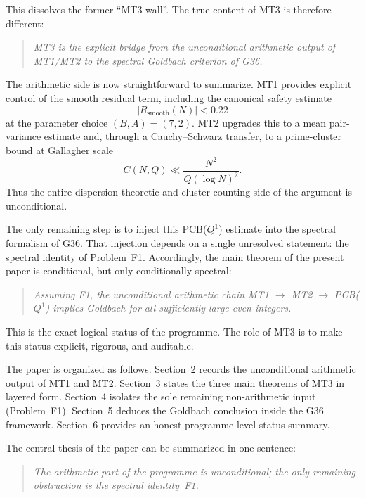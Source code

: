 \documentclass[11pt,a4paper]{article}
\begin{document}
This dissolves the former ``MT3 wall''. The true content of MT3 is therefore different:

\begin{quote}
\emph{MT3 is the explicit bridge from the unconditional arithmetic output of MT1/MT2 to the spectral Goldbach criterion of G36.}
\end{quote}

The arithmetic side is now straightforward to summarize. MT1 provides explicit control of the smooth residual term, including the canonical safety estimate
\[
|R_{\mathrm{smooth}}(N)| < 0.22
\]
at the parameter choice $(B,A) = (7,2)$. MT2 upgrades this to a mean pair-variance estimate and, through a Cauchy--Schwarz transfer, to a prime-cluster bound at Gallagher scale
\[
C(N,Q) \ll \frac{N^2}{Q(\log N)^2}.
\]
Thus the entire dispersion-theoretic and cluster-counting side of the argument is unconditional.

The only remaining step is to inject this PCB($Q^1$) estimate into the spectral formalism of G36. That injection depends on a single unresolved statement: the spectral identity of Problem~F1. Accordingly, the main theorem of the present paper is conditional, but only conditionally spectral:

\begin{quote}
\emph{Assuming F1, the unconditional arithmetic chain MT1 $\to$ MT2 $\to$ PCB($Q^1$) implies Goldbach for all sufficiently large even integers.}
\end{quote}

This is the exact logical status of the programme. The role of MT3 is to make this status explicit, rigorous, and auditable.

\medskip

The paper is organized as follows. Section~2 records the unconditional arithmetic output of MT1 and MT2. Section~3 states the three main theorems of MT3 in layered form. Section~4 isolates the sole remaining non-arithmetic input (Problem~F1). Section~5 deduces the Goldbach conclusion inside the G36 framework. Section~6 provides an honest programme-level status summary.

The central thesis of the paper can be summarized in one sentence:

\begin{quote}
\emph{The arithmetic part of the programme is unconditional; the only remaining obstruction is the spectral identity~F1.}
\end{quote}

\end{document}
